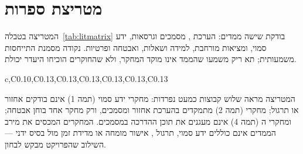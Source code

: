 \section{מטריצת ספרות}\label{sec:matrix}
המטריצה בטבלה~\ref{tab:litmatrix} בודקת שישה ממדים: הערכת , מסמכים וגרסאות, ידע סמוי, \threeD{} ומציאות מורחבת,
למידה ושאלות, ואבטחה ופרטיות. נקודה מסמנת התייחסות משמעותית; תא ריק משמעו שהממד אינו מוקד המחקר, ולא שהחוקרים הוכיחו
היעדר יכולת.
\begin{table}[!htbp]
\centering
\caption{מטריצת מושגים בשישה ממדים ( מאמרים): אף מחקר אינו מכסה את כל השורה}\label{tab:litmatrix}
\begin{pctable}{c,C{0.10},C{0.13},C{0.13},C{0.13},C{0.13},C{0.13},C{0.13}}
  \midrule
\end{pctable}
\end{table}
המטריצה מראה שלוש קבוצות כמעט נפרדות: מחקרי ידע סמוי (תמה 1) אינם בודקים אחזור או תרגול; מחקרי  (תמה 2) מתמקדים
בהערכת אחזור ומסמכים, ורק מחקר אחד בוחן אבטחה; ומחקרי ה\threeD{} (תמה 4) אינם מעגנים את תוכן ההדרכה במסמכים. המחקרים המכסים
את מירב הממדים \cite{zheng2025knowshift,hua2025civask} אינם כוללים ידע סמוי, תרגול , אישור מומחה או מדידת זמן מול בסיס
ידני --- השילוב שהפרויקט מבקש לבחון.

